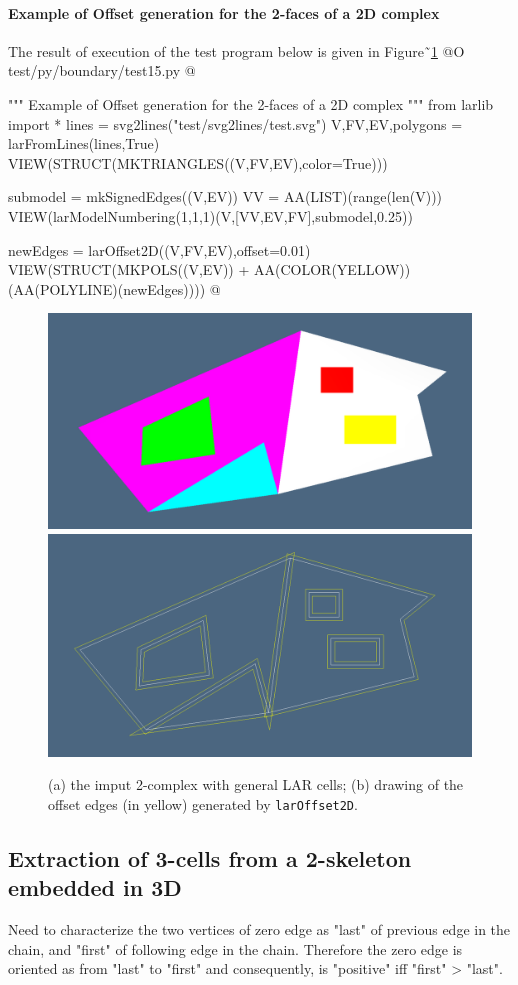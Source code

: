 \documentclass[11pt,oneside]{article}    %
\begin{document}
\paragraph{Example of Offset generation for the 2-faces of a 2D complex}
The result of execution of the test program below is given in Figure˜\ref{fig:offset}
@O test/py/boundary/test15.py
@{""" Example of Offset generation for the 2-faces of a 2D complex """
from larlib import *
lines = svg2lines("test/svg2lines/test.svg")
V,FV,EV,polygons = larFromLines(lines,True)
VIEW(STRUCT(MKTRIANGLES((V,FV,EV),color=True)))

submodel = mkSignedEdges((V,EV))
VV = AA(LIST)(range(len(V)))
VIEW(larModelNumbering(1,1,1)(V,[VV,EV,FV],submodel,0.25))

newEdges = larOffset2D((V,FV,EV),offset=0.01)
VIEW(STRUCT(MKPOLS((V,EV)) + AA(COLOR(YELLOW))(AA(POLYLINE)(newEdges))))
@}

\begin{figure}[htbp] %
   \centering
   \includegraphics[width=0.49\linewidth]{images/offset1} 
   \includegraphics[width=0.49\linewidth]{images/offset2} 
   \caption{(a) the imput 2-complex with general LAR cells; (b) drawing of the offset edges (in yellow) generated by \texttt{larOffset2D}.}
   \label{fig:offset}
\end{figure}

\subsection{Extraction of 3-cells from a 2-skeleton embedded in 3D}
Need to characterize the two vertices of zero edge as "last" of previous edge in the chain,
and "first" of following edge in the chain. Therefore the zero edge is oriented as from "last" to "first" and consequently, is "positive" iff  "first" > "last".
\end{document}
